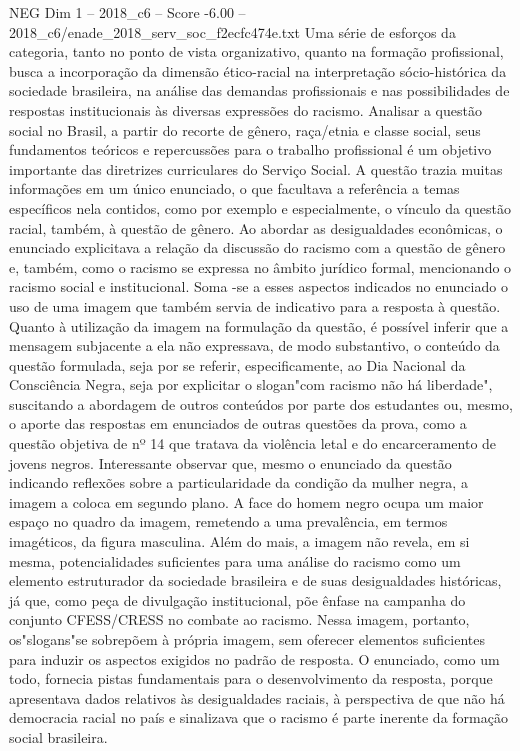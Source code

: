 \begin{textsample}{NEG Dim 1 – 2018\_c6 – Score -6.00 – 2018\_c6/enade\_2018\_serv\_soc\_f2ecfc474e.txt}
Uma série de esforços da categoria, tanto no ponto de vista organizativo, quanto na formação profissional, busca a incorporação da dimensão ético-racial na interpretação sócio-histórica da sociedade brasileira, na análise das demandas profissionais e nas possibilidades de respostas institucionais às diversas expressões do racismo.
Analisar a questão social no Brasil, a partir do recorte de gênero, raça/etnia e classe social, seus fundamentos teóricos e repercussões para o trabalho profissional é um objetivo importante das diretrizes curriculares do Serviço Social.
A questão trazia muitas informações em um único enunciado, o que facultava a referência a temas específicos nela contidos, como por exemplo e especialmente, o vínculo da questão racial, também, à questão de gênero.
Ao abordar as desigualdades econômicas, o enunciado explicitava a relação da discussão do racismo com a questão de gênero e, também, como o racismo se expressa no âmbito jurídico formal, mencionando o racismo social e institucional.
Soma -se a esses aspectos indicados no enunciado o uso de uma imagem que também servia de indicativo para a resposta à questão.
Quanto à utilização da imagem na formulação da questão, é possível inferir que a mensagem subjacente a ela não expressava, de modo substantivo, o conteúdo da questão formulada, seja por se referir, especificamente, ao Dia Nacional da Consciência Negra, seja por explicitar o slogan"com racismo não há liberdade", suscitando a abordagem de outros conteúdos por parte dos estudantes ou, mesmo, o aporte das respostas em enunciados de outras questões da prova, como a questão objetiva de nº 14 que tratava da violência letal e do encarceramento de jovens negros.
Interessante observar que, mesmo o enunciado da questão indicando reflexões sobre a particularidade da condição da mulher negra, a imagem a coloca em segundo plano.
A face do homem negro ocupa um maior espaço no quadro da imagem, remetendo a uma prevalência, em termos imagéticos, da figura masculina.
Além do mais, a imagem não revela, em si mesma, potencialidades suficientes para uma análise do racismo como um elemento estruturador da sociedade brasileira e de suas desigualdades históricas, já que, como peça de divulgação institucional, põe ênfase na campanha do conjunto CFESS/CRESS no combate ao racismo.
Nessa imagem, portanto, os"slogans"se sobrepõem à própria imagem, sem oferecer elementos suficientes para induzir os aspectos exigidos no padrão de resposta.
O enunciado, como um todo, fornecia pistas fundamentais para o desenvolvimento da resposta, porque apresentava dados relativos às desigualdades raciais, à perspectiva de que não há democracia racial no país e sinalizava que o racismo é parte inerente da formação social brasileira.

\end{textsample}
